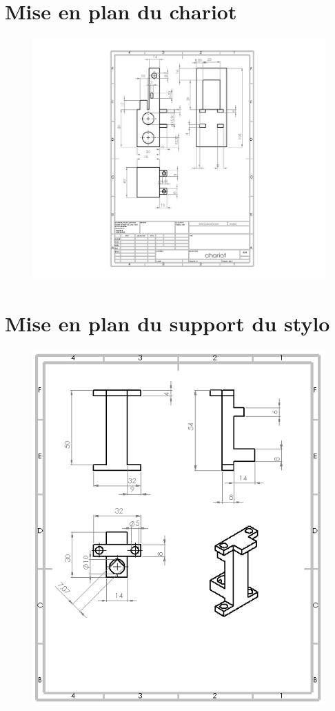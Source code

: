 \documentclass[12pt,a4paper]{report}
\newenvironment{changemargin}[2]{\begin{list}{}{%
\setlength{\topsep}{0pt}%
\setlength{\leftmargin}{0pt}%
\setlength{\rightmargin}{0pt}%
\setlength{\listparindent}{\parindent}%
\setlength{\itemindent}{\parindent}%
\setlength{\parsep}{0pt plus 1pt}%
\addtolength{\leftmargin}{#1}%
\addtolength{\rightmargin}{#2}%
}\item }{\end{list}}
\begin{document}
\begin{changemargin}{-2cm}{-4cm}
\chapter*{Mise en plan du chariot}
\begin{figure}[!h]
 \center
 \includegraphics[scale=1]{../3DModels/chariot.png}
\end{figure}
\chapter*{Mise en plan du support du stylo}
\begin{figure}[!h]
 \center
 \includegraphics[scale=1]{../3DModels/supportstylo.png}
\end{figure}

\end{changemargin}
\end{document}
